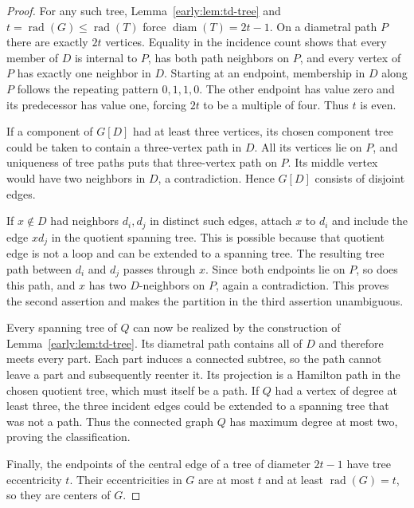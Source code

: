 \documentclass[11pt,a4paper]{article}
\theoremstyle{definition}\newtheorem{definition}[theorem]{Definition}
\theoremstyle{remark}\newtheorem{remark}[theorem]{Remark}
\newcommand{\rad}{\operatorname{rad}}
\newcommand{\diam}{\operatorname{diam}}
\begin{document}
\begin{proof}
For any such tree, Lemma~\ref{early:lem:td-tree} and
$t=\rad(G)\leq\rad(T)$ force $\diam(T)=2t-1$.  On a diametral
path $P$ there are exactly $2t$ vertices.  Equality in the incidence
count shows that every member of $D$ is internal to $P$, has both
path neighbors on $P$, and every vertex of $P$ has exactly one
neighbor in $D$.  Starting at an endpoint, membership in $D$ along
$P$ follows the repeating pattern $0,1,1,0$.  The other endpoint has
value zero and its predecessor has value one, forcing $2t$ to be a
multiple of four.  Thus $t$ is even.

If a component of $G[D]$ had at least three vertices, its chosen
component tree could be taken to contain a three-vertex path in $D$.
All its vertices lie on $P$, and uniqueness of tree paths puts that
three-vertex path on $P$.  Its middle vertex would have two neighbors
in $D$, a contradiction.  Hence $G[D]$ consists of disjoint edges.

If $x\notin D$ had neighbors $d_i,d_j$ in distinct such edges, attach
$x$ to $d_i$ and include the edge $xd_j$ in the quotient spanning
tree.  This is possible because that quotient edge is not a loop and
can be extended to a spanning tree.  The resulting tree path between
$d_i$ and $d_j$ passes through $x$.  Since both endpoints lie on $P$,
so does this path, and $x$ has two $D$-neighbors on $P$, again a
contradiction.  This proves the second assertion and makes the
partition in the third assertion unambiguous.

Every spanning tree of $Q$ can now be realized by the construction of
Lemma~\ref{early:lem:td-tree}.  Its diametral path contains all of $D$
and therefore meets every part.  Each part induces a connected
subtree, so the path cannot leave a part and subsequently reenter it.
Its projection is a Hamilton path in the chosen quotient tree, which
must itself be a path.  If $Q$ had a vertex of degree at least three,
the three incident edges could be extended to a spanning tree that
was not a path.  Thus the connected graph $Q$ has maximum degree at
most two, proving the classification.

Finally, the endpoints of the central edge of a tree of diameter
$2t-1$ have tree eccentricity $t$.  Their eccentricities in $G$ are
at most $t$ and at least $\rad(G)=t$, so they are centers of $G$.
\end{proof}
\end{document}
